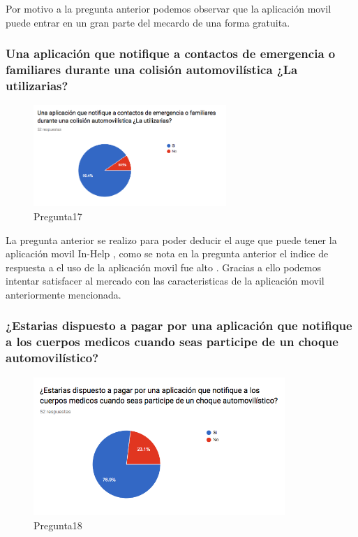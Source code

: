 Por motivo a la pregunta anterior podemos observar que la aplicación movil puede entrar en un gran parte del mecardo de una forma gratuita.

\subsubsection{Una aplicación que notifique a contactos de emergencia o familiares durante una colisión automovilística ¿La utilizarias?}

\begin{figure}[htbp!]
	\begin{center}
		\includegraphics[width=0.65\textwidth]{DisenoEstructura/imagenes/Pregunta17}
		\caption{Pregunta17}
		\label{DE/FO/Pregunta17}
	\end{center}
\end{figure}

La pregunta anterior se realizo para poder deducir el auge que puede tener la aplicación movil In-Help , como se nota en la pregunta anterior el indice de respuesta a el uso de la aplicación movil fue alto . Gracias a ello podemos intentar satisfacer al mercado con las caracteristicas de la aplicación movil anteriormente mencionada.

\subsubsection{¿Estarias dispuesto a pagar por una aplicación que notifique a los cuerpos medicos cuando seas participe de un choque automovilístico?}

\begin{figure}[htbp!]
	\begin{center}
		\includegraphics[width=0.85\textwidth]{DisenoEstructura/imagenes/Pregunta18}
		\caption{Pregunta18}
		\label{DE/FO/Pregunta18}
	\end{center}
\end{figure}

